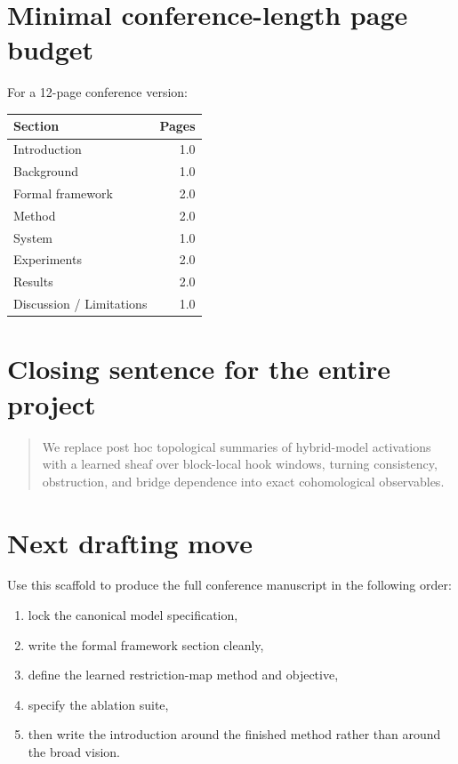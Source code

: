 \documentclass[11pt]{article}
\begin{document}
\section{Minimal conference-length page budget}

For a 12-page conference version:
\begin{center}
\begin{tabular}{lr}
\toprule
Section & Pages \\
\midrule
Introduction & 1.0 \\
Background & 1.0 \\
Formal framework & 2.0 \\
Method & 2.0 \\
System & 1.0 \\
Experiments & 2.0 \\
Results & 2.0 \\
Discussion / Limitations & 1.0 \\
\bottomrule
\end{tabular}
\end{center}

\section*{Closing sentence for the entire project}

\begin{quote}
We replace post hoc topological summaries of hybrid-model activations with a learned sheaf over block-local hook windows, turning consistency, obstruction, and bridge dependence into exact cohomological observables.
\end{quote}

\section*{Next drafting move}

Use this scaffold to produce the full conference manuscript in the following order:
\begin{enumerate}[leftmargin=1.5em]
    \item lock the canonical model specification,
    \item write the formal framework section cleanly,
    \item define the learned restriction-map method and objective,
    \item specify the ablation suite,
    \item then write the introduction around the finished method rather than around the broad vision.
\end{enumerate}
\end{document}
